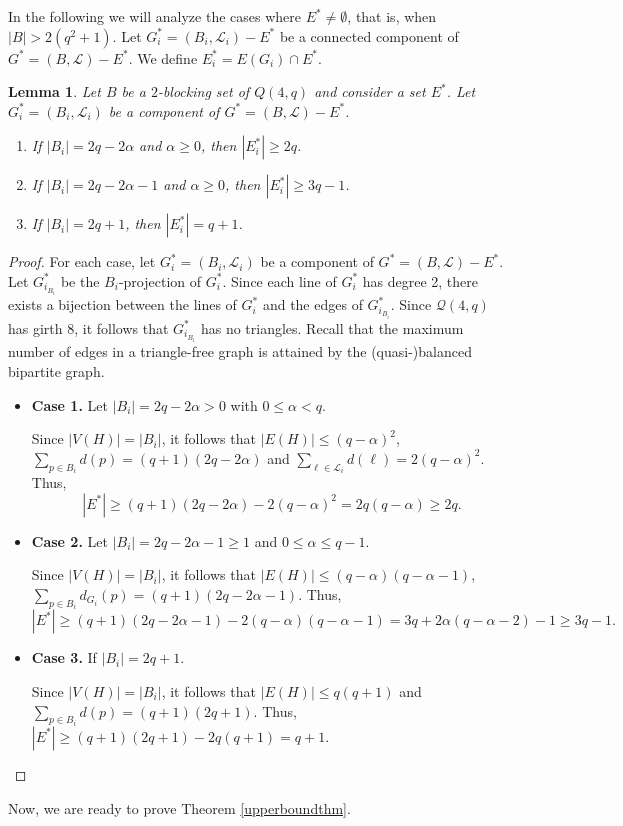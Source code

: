 \documentclass[12pt]{article}
\newtheorem{lemma}[theorem]{Lemma}
\begin{document}
In the following we will analyze the cases where $E^*\neq \emptyset$, that is, when {$|B|>2(q^2+1)$. Let $G^*_i=(B_i,\mathcal{L}_i)-E^*$ be a connected component of $G^*=(B,\mathcal{L})-E^*$.}
We define $E^*_i=E(G_i)\cap E^*.$

\begin{lemma}\label{lem:B-E*}
    Let $B$ be a $2$-blocking set of $Q(4,q)$ and consider a set $E^*$. 
    Let $G^*_i=(B_i,{\mathcal{L}}_i)$ be a component of $G^*=(B,\mathcal{L})-E^*$.
        \begin{enumerate}
        \item If $|B_i|=2q-2\alpha$ and $\alpha\ge0$, then $|E^*_i|\ge 2q$.
        \item If $|B_i|=2q-2\alpha-1$ and $\alpha\ge0$, then $|E^*_i|\ge 3q-1$.
       \item If $|B_i|=2q+1$, then $|E^*_i|= q+1$.
     \end{enumerate}
\end{lemma}

\begin{proof}
    For each case, let $G^*_i=(B_i,\mathcal{L}_i)$ be a component of $G^*=(B,\mathcal{L})-E^*$. Let $G_{i_{B_i}}^*$ be the $B_i$-projection of $G_i^*$. Since each line of $G_i^*$ has degree 2, there exists a bijection between the lines of $G_i^*$ and the edges of $G_{i_{B_i}}^*$. Since $\mathcal{Q}(4,q)$ has girth 8, it follows that $G_{i_{B_i}}^*$ has no triangles. Recall that the maximum number of edges in a triangle-free graph is attained by the (quasi-)balanced bipartite graph. 

    \begin{itemize}
    
    \item {\bf{Case 1.}} Let $|B_i|=2q-2\alpha>0$ with $0\leq \alpha<q$. 
    
    Since $|V(H)|=|B_i|$, it follows that $|E(H)|\le(q-\alpha)^2$, $\sum_{p\in B_i} d(p)=(q+1)(2q-2\alpha)$ and $\sum_{\ell\in \mathcal{L}_i} d(\ell)=2(q-\alpha)^2$. Thus,
    $$|E^*|\ge(q+1)(2q-2\alpha)-2(q-\alpha)^2=2q(q-\alpha)\ge2q.$$ 
    
    \item {\bf{Case 2.}} Let $|B_i|=2q-2\alpha-1\ge1$ and $0\le\alpha\le q-1$. 
    
    Since $|V(H)|=|B_i|$, it follows that $|E(H)|\le(q-\alpha)(q-\alpha-1)$, $\sum_{p\in B_i} d_{G_i}(p)=(q+1)(2q-2\alpha-1)$. Thus, 
    $$|E^*|\ge(q+1)(2q-2\alpha-1)-2(q-\alpha)(q-\alpha-1)=3q+2\alpha(q-\alpha-2)-1\ge 3q-1.$$
    
    \item {\bf{Case 3.}} If $|B_i|=2q+1$.
    
    Since $|V(H)|=|B_i|$, it follows that $|E(H)|\le q(q+1)$ and $\sum_{p\in B_i} d(p)=(q+1)(2q+1)$. Thus,
     $|E^*|\ge(q+1)(2q+1)-2q(q+1)=q+1.$
     \end{itemize}
\end{proof}
Now, we are ready to {prove} Theorem \ref{upperboundthm}.
\end{document}
